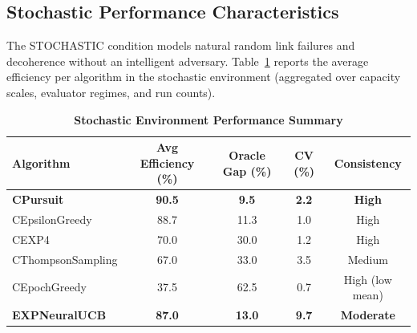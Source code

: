 \documentclass[12pt,a4paper]{article}
\newcommand{\stochastic}[1]{\textcolor{stochasticcolor}{\textbf{#1}}}
\newcommand{\legacy}[1]{\textcolor{legacycolor}{\textbf{#1}}}
\begin{document}
\begin{tcolorbox}[colback=stochasticcolor!10,colframe=stochasticcolor,title=\textbf{Stochastic Environment Deep Analysis (1$\times$–2$\times$ Capacities, T/Tb Combined)}]

\subsection{Stochastic Performance Characteristics}

The STOCHASTIC condition models natural random link failures and decoherence without an intelligent adversary. Table~\ref{tab:stoch-performance} reports the average efficiency per algorithm in the stochastic environment (aggregated over capacity scales, evaluator regimes, and run counts).

\begin{table}[H]
\centering
\caption{\stochastic{Stochastic Environment Performance Summary}}
\label{tab:stoch-performance}
\begin{tabular}{|l|c|c|c|c|}
\hline
\textbf{Algorithm} & \textbf{Avg Efficiency (\%)} & \textbf{Oracle Gap (\%)} & \textbf{CV (\%)} & \textbf{Consistency} \\
\hline
\hline
\stochastic{CPursuit}        & \stochastic{\textbf{90.5}} & \stochastic{9.5}  & \stochastic{2.2} & \stochastic{High} \\
CEpsilonGreedy               & 88.7                        & 11.3              & 1.0              & High \\
CEXP4                        & 70.0                        & 30.0              & 1.2              & High \\
CThompsonSampling            & 67.0                        & 33.0              & 3.5              & Medium \\
CEpochGreedy                 & 37.5                        & 62.5              & 0.7              & High (low mean) \\
\legacy{EXPNeuralUCB}        & \legacy{87.0}               & \legacy{13.0}     & \legacy{9.7}     & \legacy{Moderate} \\
\hline
\end{tabular}
\end{table}


\end{tcolorbox}
\end{document}

